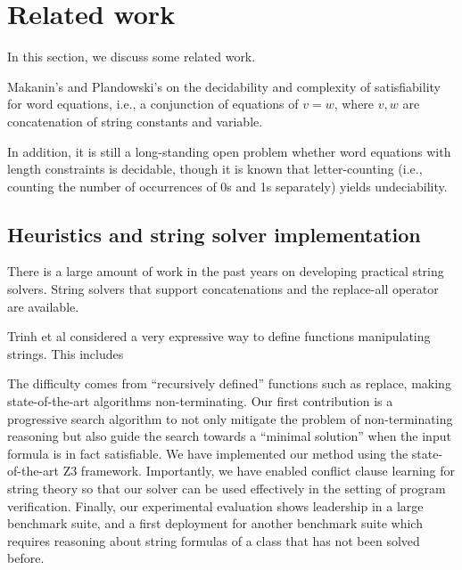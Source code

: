
\section{Related work}

In this section, we discuss some related work. 

  Makanin’s and Plandowski’s  on the decidability
and complexity of satisfiability for word equations, i.e., a conjunction of equations of $v=w$, where $v, w$ are concatenation of string constants and variable. 

In addition, it is still a long-standing open problem whether word equations with length constraints is decidable, though it is known that letter-counting (i.e., counting the number of occurrences of 0s and 1s separately) yields undeciability.  

\subsection*{Heuristics and string solver implementation}

There is a large amount of work in the past years on developing practical string solvers. String solvers that support concatenations and the replace-all operator are available. \cite{BTV09, TCJ14, YABI14,TCJ16}


\cite{TCJ16} 
Trinh et al considered %
a very expressive way to define functions manipulating strings. This includes  

The difficulty comes from “recursively defined” functions such as replace, making state-of-the-art algorithms non-terminating. Our first contribution is a progressive search algorithm to not only mitigate the problem of non-terminating reasoning but also guide the search towards a “minimal solution” when the input formula is in fact satisfiable. We have implemented our method using the state-of-the-art Z3 framework. Importantly, we have enabled conflict clause learning for string theory so that our solver can be used effectively in the setting of program verification. Finally, our experimental evaluation shows leadership in a large benchmark suite, and a first deployment for another benchmark suite which requires reasoning about string formulas of a class that has not been solved before.

